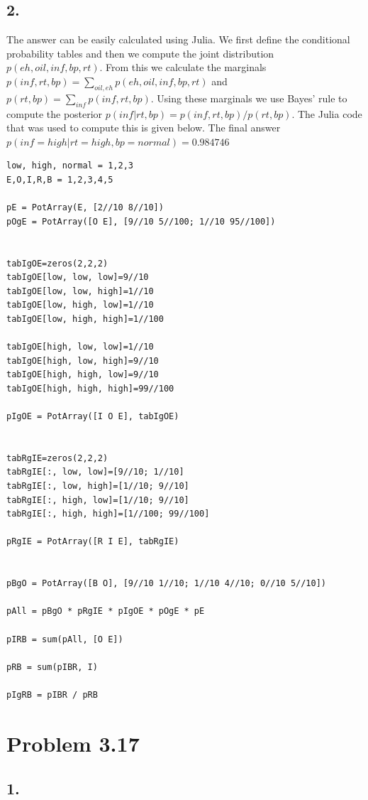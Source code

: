 \documentclass[11pt,a4paper,oneside]{report}
\begin{document}
\subsection*{2.}

The answer can be easily calculated using Julia. We first define the 
conditional probability tables and then we compute the joint distribution 
$p(eh, oil, inf, bp, rt)$. From this we calculate the marginals $p(inf,rt,bp) 
= \sum_{oil, eh}p(eh, oil, inf, bp, rt)$ and $p(rt,bp) = 
\sum_{inf}p(inf, rt, bp)$. Using these marginals we use Bayes' rule to compute 
the posterior $p(inf|rt, bp) = p(inf, rt, bp)/p(rt, bp)$. The Julia code that 
was used to compute this is given below. The final answer $p(inf = high | rt 
= high, bp = normal) = 0.984746 $\\

\begin{lstlisting}
low, high, normal = 1,2,3
E,O,I,R,B = 1,2,3,4,5

pE = PotArray(E, [2//10 8//10])
pOgE = PotArray([O E], [9//10 5//100; 1//10 95//100])


tabIgOE=zeros(2,2,2)
tabIgOE[low, low, low]=9//10
tabIgOE[low, low, high]=1//10
tabIgOE[low, high, low]=1//10
tabIgOE[low, high, high]=1//100

tabIgOE[high, low, low]=1//10
tabIgOE[high, low, high]=9//10
tabIgOE[high, high, low]=9//10
tabIgOE[high, high, high]=99//100

pIgOE = PotArray([I O E], tabIgOE)


tabRgIE=zeros(2,2,2)
tabRgIE[:, low, low]=[9//10; 1//10]
tabRgIE[:, low, high]=[1//10; 9//10]
tabRgIE[:, high, low]=[1//10; 9//10]
tabRgIE[:, high, high]=[1//100; 99//100]

pRgIE = PotArray([R I E], tabRgIE)


pBgO = PotArray([B O], [9//10 1//10; 1//10 4//10; 0//10 5//10])

pAll = pBgO * pRgIE * pIgOE * pOgE * pE

pIRB = sum(pAll, [O E])

pRB = sum(pIBR, I)

pIgRB = pIBR / pRB

\end{lstlisting}


\section*{Problem 3.17}

\subsection*{1.}
\end{document}
